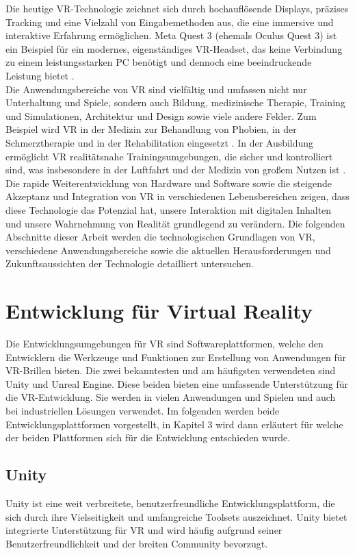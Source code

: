 \noindent
Die heutige VR-Technologie zeichnet sich durch hochauflösende Displays, präzises Tracking und eine Vielzahl von Eingabemethoden aus, die eine immersive und interaktive Erfahrung ermöglichen. Meta Quest 3 (ehemals Oculus Quest 3) ist ein Beispiel für ein modernes, eigenständiges VR-Headset, das keine Verbindung zu einem leistungsstarken PC benötigt und dennoch eine beeindruckende Leistung bietet \cite{meta2023}.
\\

\noindent
Die Anwendungsbereiche von VR sind vielfältig und umfassen nicht nur Unterhaltung und Spiele, sondern auch Bildung, medizinische Therapie, Training und Simulationen, Architektur und Design sowie viele andere Felder. Zum Beispiel wird VR in der Medizin zur Behandlung von Phobien, in der Schmerztherapie und in der Rehabilitation eingesetzt \cite{rizzo2017}. In der Ausbildung ermöglicht VR realitätsnahe Trainingsumgebungen, die sicher und kontrolliert sind, was insbesondere in der Luftfahrt und der Medizin von großem Nutzen ist \cite{huang2018}.
\\

\noindent
Die rapide Weiterentwicklung von Hardware und Software sowie die steigende Akzeptanz und Integration von VR in verschiedenen Lebensbereichen zeigen, dass diese Technologie das Potenzial hat, unsere Interaktion mit digitalen Inhalten und unsere Wahrnehmung von Realität grundlegend zu verändern. Die folgenden Abschnitte dieser Arbeit werden die technologischen Grundlagen von VR, verschiedene Anwendungsbereiche sowie die aktuellen Herausforderungen und Zukunftsaussichten der Technologie detailliert untersuchen.


\section{Entwicklung für Virtual Reality}
Die Entwicklungsumgebungen für VR sind Softwareplattformen, welche den Entwicklern die Werkzeuge und Funktionen zur Erstellung von Anwendungen für VR-Brillen bieten. Die zwei bekanntesten und am häufigsten verwendeten sind Unity und Unreal Engine. Diese beiden bieten eine umfassende Unterstützung für die VR-Entwicklung. Sie werden in vielen Anwendungen und Spielen und auch bei industriellen Lösungen verwendet. Im folgenden werden beide Entwicklungsplattformen vorgestellt, in Kapitel 3 wird dann erläutert für welche der beiden Plattformen sich für die Entwicklung entschieden wurde.
\subsection{Unity}
Unity ist eine weit verbreitete, benutzerfreundliche Entwicklungsplattform, die sich durch ihre Vielseitigkeit und umfangreiche Toolsets auszeichnet. Unity bietet integrierte Unterstützung für VR und wird häufig aufgrund seiner Benutzerfreundlichkeit und der breiten Community bevorzugt.
